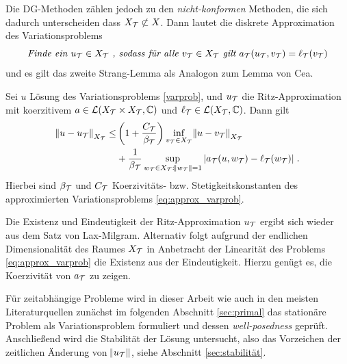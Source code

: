 Die DG-Methoden zählen jedoch zu den \emph{nicht-konformen} Methoden, die sich dadurch unterscheiden dass $X_{\mathcal{T}}\not\subset X$. Dann lautet die diskrete Approximation des Variationsproblems
\begin{equation}
  \emph{Finde ein } u_{\mathcal{T}}\in X_{\mathcal{T}}\emph{ , sodass für alle } v_{\mathcal{T}}\in X_{\mathcal{T}} \emph{ gilt } a_{\mathcal{T}}(u_{\mathcal{T}}, v_{\mathcal{T}}) = \ell_{\mathcal{T}}(v_{\mathcal{T}})
  \label{eq:approx_varprob}
\end{equation}
und es gilt das zweite Strang-Lemma als Analogon zum Lemma von Cea.
\begin{satz}\label{strang}
  Sei $u$ Lösung des Variationsproblems \ref{varprob}, und $u_{\mathcal{T}}$ die Ritz-Approximation mit koerzitivem $a \in \mathcal{L}(X_{\mathcal{T}} \times X_{\mathcal{T}}, \mathbb{C})$ und $\ell_{\mathcal{T}} \in \mathcal{L}(X_{\mathcal{T}}, \mathbb{C})$. Dann gilt
  \begin{equation}
    \begin{aligned}
    \norm{u-u_{\mathcal{T}}}_{X_{\mathcal{T}}} \leq &\left(1 +\frac{C_{\mathcal{T}}}{\beta_{\mathcal{T}}}\right) \inf_{v_{\mathcal{T}} \in X_{\mathcal{T}}}\norm{u-v_{\mathcal{T}}}_{X_{\mathcal{T}}} \\
    & +\frac{1}{\beta_{\mathcal{T}}} \sup_{w_{\mathcal{T}} \in X_{\mathcal{T}}: \norm{w_{\mathcal{T}}}=1} |a_{\mathcal{T}}(u,w_{\mathcal{T}})-\ell_{\mathcal{T}}(w_{\mathcal{T}})| \; .
  \end{aligned}
  \end{equation}
  Hierbei sind $\beta_{\mathcal{T}}$ und $C_{\mathcal{T}}$ Koerzivitäts- bzw. Stetigkeitskonstanten des approximierten Variationsproblems \ref{eq:approx_varprob}.
\end{satz}
Die Existenz und Eindeutigkeit der Ritz-Approximation $u_{\mathcal{T}}$ ergibt sich wieder aus dem Satz von Lax-Milgram. Alternativ folgt aufgrund der endlichen Dimensionalität des Raumes $X_{\mathcal{T}}$ in Anbetracht der Linearität des Problems \eqref{eq:approx_varprob} die Existenz aus der Eindeutigkeit. Hierzu genügt es, die Koerzivität von $a_{\mathcal{T}}$ zu zeigen.

Für zeitabhängige Probleme wird in dieser Arbeit wie auch in den meisten Literaturquellen \cite{NLS} zunächst im folgenden Abschnitt \ref{sec:primal} das stationäre Problem als Variationsproblem formuliert und dessen \emph{well-posedness} geprüft. Anschließend wird die Stabilität der Lösung untersucht, also das Vorzeichen der zeitlichen Änderung von $\norm{u_{\mathcal{T}}}$, siehe Abschnitt \ref{sec:stabilität}.


